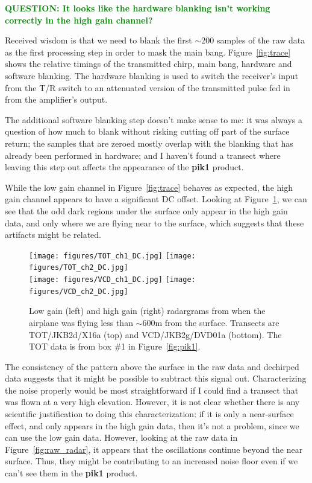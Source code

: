 \documentclass[11pt]{article}
\newcommand{\question}[1]{\ifthenelse{\boolean{include-questions}} {\textcolor{Green}{\textbf{QUESTION: #1}}}{}}
\newcommand{\figref}[1]{Figure~\ref{#1}}
\begin{document}
\question{It looks like the hardware blanking isn't working correctly in the high gain channel?}

Received wisdom is that we need to blank the first $\sim$200 samples of the raw data as the first processing step in order to mask the main bang. \figref{fig:trace} shows the relative timings of the transmitted chirp, main bang, hardware and software blanking. The hardware blanking is used to switch the receiver's input from the T/R switch to an attenuated version of the transmitted pulse fed in from the amplifier's output. 

The additional software blanking step doesn't make sense to me: it was always a question of how much to blank without risking cutting off part of the surface return; the samples that are zeroed mostly overlap with the blanking that has already been performed in hardware; and I haven't found a transect where leaving this step out affects the appearance of the \textbf{pik1} product.

While the low gain channel in \figref{fig:trace} behaves as expected, the high gain channel appears to have a significant DC offset. Looking at \figref{fig:ch2_DC_artifact}, we can see that the odd dark regions under the surface only appear in the high gain data, and only where we are flying near to the surface, which suggests that these artifacts might be related. 

\begin{figure}[ht!]
\centering
\texttt{[image: figures/TOT\_ch1\_DC.jpg]}
\texttt{[image: figures/TOT\_ch2\_DC.jpg]} \\
\vspace{2pt}
\texttt{[image: figures/VCD\_ch1\_DC.jpg]}
\texttt{[image: figures/VCD\_ch2\_DC.jpg]}
\caption[]{Low gain (left) and high gain (right) radargrams from when the airplane was flying less than $\sim$600m from the surface. Transects are TOT/JKB2d/X16a (top) and VCD/JKB2g/DVD01a (bottom). The TOT data is from box \#1 in \figref{fig:pik1}.}
\label{fig:ch2_DC_artifact}
\end{figure}

The consistency of the pattern above the surface in the raw data and dechirped data suggests that it might be possible to subtract this signal out. Characterizing the noise properly would be most straightforward if I could find a transect that was flown at a very high elevation. However, it is not clear whether there is any scientific justification to doing this characterization: if it is only a near-surface effect, and only appears in the high gain data, then it's not a problem, since we can use the low gain data. However, looking at the raw data in \figref{fig:raw_radar}, it appears that the oscillations continue beyond the near surface. Thus, they might be contributing to an increased noise floor even if we can't see them in the \textbf{pik1} product. 
\end{document}
